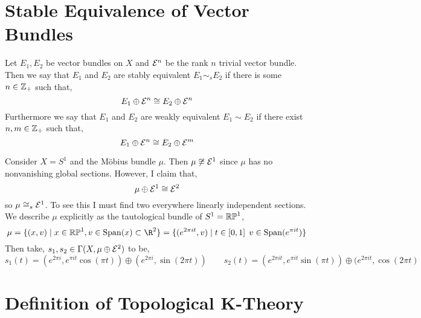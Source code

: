 \documentclass[12pt]{extarticle}
\begin{document}
\section{Stable Equivalence of Vector Bundles}

\begin{definition}
Let $E_1, E_2$ be vector bundles on $X$ and $\mathcal{E}^n$ be the rank $n$ trivial vector bundle. Then we say that $E_1$ and $E_2$ are stably equivalent $E_1 \sim_s E_2$ if there is some $n \in \mathbb{Z}_+$ such that,
\[ E_1 \oplus \mathcal{E}^n \cong E_2 \oplus \mathcal{E}^n \]
Furthermore we say that $E_1$ and $E_2$ are weakly equivalent $E_1 \sim E_2$ if there exist $n,m \in \mathbb{Z}_+$ such that,
\[ E_1 \oplus \mathcal{E}^n \cong E_2 \oplus \mathcal{E}^m \]
\end{definition}

\begin{example}
Consider $X = S^1$ and the M\"{o}bius bundle $\mu$. Then $\mu \not\cong \mathcal{E}^1$ since $\mu$ has no nonvanishing global sections. However, I claim that,
\[ \mu \oplus \mathcal{E}^1 \cong \mathcal{E}^2 \]
so $\mu \cong_s \mathcal{E}^1$. To see this I must find two everywhere linearly independent sections. 
\bigskip\\
We describe $\mu$ explicitly as the tautological bundle of $S^1 = \mathbb{RP}^1$,
\[ \mu = \{ (x, v) \mid x \in \RP^1, v \in \mathrm{Span}(x) \subset \R^2 \} = \{ (e^{2 \pi i t}, v) \mid t \in [0, 1] \: \: v \in \mathrm{Span}(e^{\pi i t}) \} \]
Then take, $s_1, s_2 \in \Gamma(X, \mu \oplus \mathcal{E}^2)$ to be,
\[ s_1(t) = (e^{2 \pi i}, e^{\pi i t} \cos{(\pi t)}) \oplus (e^{2 \pi i}, \sin{(2 \pi t)}) \quad \quad s_2(t) = (e^{2 \pi i t}, e^{\pi i t} \sin{(\pi t)}) \oplus (e^{2 \pi i t}, \cos{(2 \pi t)}  \]
\end{example}

\section{Definition of Topological K-Theory}
\end{document}
